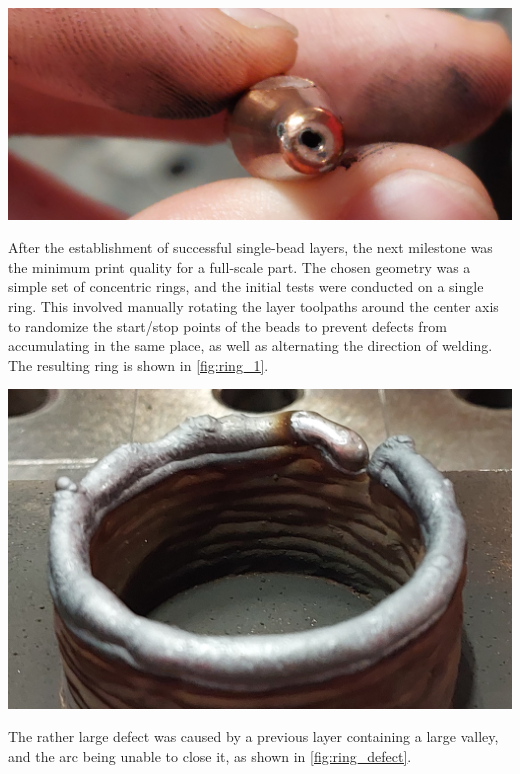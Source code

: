 \begin{minipage}{\linewidth}
    \centering
    \includegraphics[width=\linewidth]{images/tip_hole.jpg}
    \label{fig:tip_hole}
\end{minipage}

After the establishment of successful single-bead layers, the next milestone was the minimum print quality for a full-scale part. The chosen geometry was a simple set of concentric rings, and the initial tests were conducted on a single ring.
This involved manually rotating the layer toolpaths around the center axis to randomize the start/stop points of the beads to prevent defects from accumulating in the same place, as well as alternating the direction of welding. The resulting ring is shown in \autoref{fig:ring_1}.

\begin{minipage}{\linewidth}
    \centering
    \includegraphics[width=\linewidth]{images/ring_1.jpg}
    \label{fig:ring_1}
\end{minipage}

The rather large defect was caused by a previous layer containing a large valley, and the arc being unable to close it, as shown in \autoref{fig:ring_defect}.

